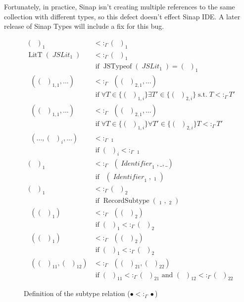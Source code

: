 \documentclass[12pt]{article}
\DeclareMathOperator{\LitT}{LitT}
\DeclareMathOperator{\JSLit}{\textit{JSLit}}
\DeclareMathOperator{\JSTypeof}{JSTypeof}
\DeclareMathOperator{\RecT}{RecT_\Gamma}
\DeclareMathOperator{\ObjT}{ObjT_\Gamma}
\DeclareMathOperator{\ListT}{ListT_\Gamma}
\DeclareMathOperator{\SetT}{SetT_\Gamma}
\DeclareMathOperator{\MapT}{MapT_\Gamma}
\DeclareMathOperator{\UnionT}{UnionT_\Gamma}
\DeclareMathOperator{\InterT}{InterT_\Gamma}
\DeclareMathOperator{\Identifier}{\textit{Identifier}}
\DeclareMathOperator{\Type}{{\textit{Type}_\Gamma}}
\DeclareMathOperator{\ObjectSubtype}{ObjectSubtype_\Gamma}
\DeclareMathOperator{\RecordSubtype}{RecordSubtype}
\DeclareMathOperator{\textif}{ if }
\DeclareMathOperator{\suchthat}{s.t.}
\newcommand{\subtype}{<:_\Gamma}
\begin{document}
Fortunately, in practice, Sinap isn't creating multiple 
references to the same collection with different types,
so this defect doesn't effect Sinap IDE. A later release 
of Sinap Types will include a fix for this bug. 

\newcommand{\stfif}{\\&\textif}

\begin{figure}
\begin{mdframed}        
\begin{align*}
    (\Type)_1&\subtype(\Type)_1 \\
    \LitT(\JSLit_1)&\subtype(\Type)_1 \stfif \JSTypeof(\JSLit_1) = (\Type)_1 \\
    \UnionT((\Type)_{1,1}, ...)&\subtype\UnionT((\Type)_{2,1}, ...) 
    \stfif \forall T\in \{(\Type)_{1,i}\} \exists T' \in \{(\Type)_{2,i}\} \suchthat T\subtype T' \\
    \InterT((\Type)_{1,1}, ...)&\subtype\InterT((\Type)_{2,1}, ...) 
    \stfif \forall T\in \{(\Type)_{1,i}\} \forall T' \in \{(\Type)_{2,i}\} T\subtype T' \\
    \InterT(..., (\Type)_i, ...)&\subtype\ObjT_1 \stfif (\Type)_i\subtype\ObjT_1  \\
    (\Type)_1 &\subtype \ObjT(\Identifier_1, \_, \_) \stfif \ObjectSubtype(\Identifier_1, \ObjT_1)\\
    (\Type)_1&\subtype(\Type)_2 \stfif \RecordSubtype(\RecT_1, \RecT_2) \\
    \ListT((\Type)_1)&\subtype\ListT((\Type)_2) \stfif (\Type)_1\subtype(\Type)_2 \\
    \SetT((\Type)_1)&\subtype\SetT((\Type)_2) \stfif (\Type)_1\subtype(\Type)_2 \\
    \MapT((\Type)_{11}, (\Type)_{12})&\subtype\MapT((\Type)_{21}, (\Type)_{22}) \stfif (\Type)_{11}\subtype(\Type)_{21} \text{ and } (\Type)_{12}\subtype(\Type)_{22} 
\end{align*}
\end{mdframed}        
\caption{Definition of the subtype relation (\(\bullet\subtype\bullet\))}
\label{subtype-definitions}
\end{figure}
\end{document}
